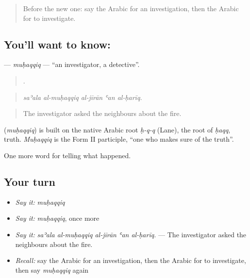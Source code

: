 \label{lesson:AR-C308-muhaqqiq}



\begin{quote}
Before the new one: say the Arabic for an investigation, then the Arabic for to investigate.
\end{quote}

\subsection*{You'll want to know: }
\textbf{} — \emph{muḥaqqiq} — \textquotedblleft{}an investigator, a detective\textquotedblright{}.

\begin{quote}
    .
\end{quote}

\begin{quote}
\emph{saʾala al-muḥaqqiq al-jīrān ʿan al-ḥarīq.}
\end{quote}

\begin{quote}
The investigator asked the neighbours about the fire.
\end{quote}

\begin{cousinweb}
\textbf{} (\emph{muḥaqqiq}) is built on the native Arabic root \emph{ḥ-q-q} (Lane), the root of \emph{ḥaqq}, truth. \emph{Muḥaqqiq} is the Form II participle, \textquotedblleft{}one who makes sure of the truth\textquotedblright{}.
\end{cousinweb}

\begin{grammarlens}[title={What you've built}]
One more word for telling what happened.
\end{grammarlens}

\subsection*{Your turn}
\begin{itemize}
\raggedright
  \item \emph{Say it:} \emph{muḥaqqiq}
  \item \emph{Say it:} \emph{muḥaqqiq}, once more
  \item \emph{Say it:} \emph{saʾala al-muḥaqqiq al-jīrān ʿan al-ḥarīq.} — The investigator asked the neighbours about the fire.
  \item \emph{Recall:} say the Arabic for an investigation, then the Arabic for to investigate, then say \emph{muḥaqqiq} again
\end{itemize}

